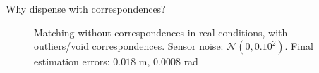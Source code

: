 \begin{frame}[noframenumbering]{Why dispense with correspondences?}

  \begin{figure}\vspace{1cm}
    \caption{Matching without correspondences in real conditions, with
             outliers/void correspondences. Sensor noise:
             $\mathcal{N}(0, 0.10^2)$. Final estimation errors: $0.018$ m,
             $0.0008$ rad}
  \end{figure}

\end{frame}
